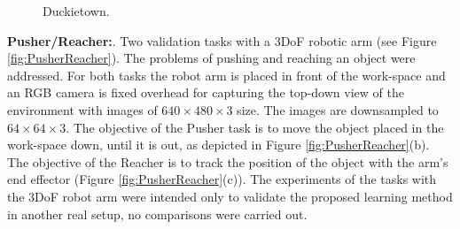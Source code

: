 \begin{figure}[h]
\centering
{} 
\hspace{1.3cm}
\hspace{2cm}
\hspace{1.3cm}
\caption{Duckietown.} 
\label{fig:duckietown2} 
\end{figure}

\textbf{Pusher/Reacher:}. Two validation tasks with a 3DoF robotic arm (see Figure \ref{fig:PusherReacher}). The problems of pushing  and reaching an object were addressed.  
For both tasks the robot arm is placed in front of the work-space and an RGB camera is fixed overhead for capturing the top-down view of the environment with images of $640\times480\times3$ size. The images are downsampled to $64\times64\times3$. The objective of the Pusher task is to move the object placed in the work-space down, until it is out, as depicted in Figure \ref{fig:PusherReacher}(b). The objective of the Reacher is to track the position of the object with the arm's end effector (Figure \ref{fig:PusherReacher}(c)). The experiments of the tasks with the 3DoF robot arm were intended only to validate the proposed learning method in another real setup, no comparisons were carried out.

